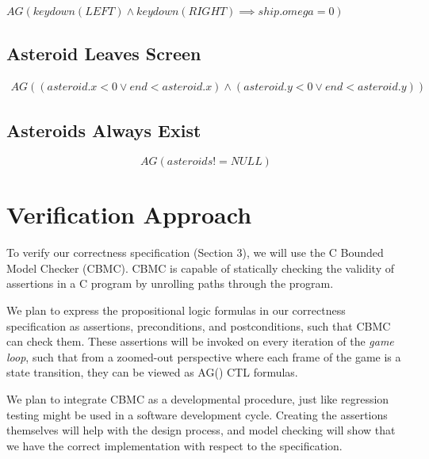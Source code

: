 \documentclass{article}
\begin{document}
        $AG(keydown(LEFT) \land keydown(RIGHT) \implies ship.omega = 0)$
	
	\subsection{Asteroid Leaves Screen}
	
		\begin{align*}
			AG((asteroid.x < 0 \lor end < asteroid.x) \land 
			(asteroid.y < 0 \lor end < asteroid.y))
		\end{align*}
    
    \subsection{Asteroids Always Exist}
    \[AG(asteroids != NULL)\]

\section{Verification Approach}

    To verify our correctness specification (Section 3), we will use the C
    Bounded Model Checker (CBMC). CBMC is capable of statically checking the
    validity of assertions in a C program by unrolling paths through the
    program.

    We plan to express the propositional logic formulas in our correctness
    specification as assertions, preconditions, and postconditions, such that
    CBMC can check them. These assertions will be invoked on every iteration of
    the \textit{game loop}, such that from a zoomed-out perspective where each
    frame of the game is a state transition, they can be viewed as AG() CTL
    formulas.

	We plan to integrate CBMC as a developmental procedure, just like regression testing might be used in a software development cycle.
	Creating the assertions themselves will help with the design process, and model checking will show that we have the correct implementation with respect to the specification.
\end{document}
